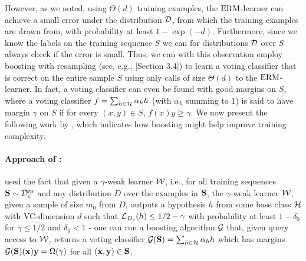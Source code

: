 However, as we noted, using $ \Theta(d) $ training examples, the $ \mathrm{ERM} $-learner can achieve a small error under the distribution $ \mathcal{D} $, from which the training examples are drawn from, with probability at least $ 1- \exp{\left(-d \right)}  $. Furthermore, since we know the labels on the training sequence $ S $ we can for distributions $\mathcal{D}$ over $S$ always check if the error is small. Thus, we can with this observation employ boosting with resampling (see, e.g., \cite{boostingbookSchapireF12}[Section 3.4]) to learn a voting classifier that is correct on the entire sample $ S $  using only calls of size $ \Theta(d) $ to the $ \mathrm{ERM} $-learner. In fact, a voting classifier can even be found with good margins on $ S $, where a voting classifier $ f =\sum_{h\in\mathcal{H}}\alpha_{h}h$ (with $ \alpha_{h} $ summing to 1) is said to have margin $ \gamma $ on $ S $ if for every $ (x,y)\in S $,  $f(x)y\geq \gamma  $. We now present the following work by \cite{Optimalweaktostronglearning}, which indicates how boosting might help improve training complexity.
\vspace{-0.3cm}
\paragraph{Approach of \cite{Optimalweaktostronglearning}:}
\cite{Optimalweaktostronglearning} used the fact that given a $\gamma$-weak learner $ \mathcal{W} $, i.e., for all training sequences $\mathbf{S}\sim \mathcal{D}_{c}^{m}$ and any distribution $D$ over the examples in $\mathbf{S}$, the $ \gamma $-weak learner $\mathcal{W}$, given a sample of size $m_{0}$ from $D$, outputs a hypothesis $h$ from some base class $\mathcal{H}$ with VC-dimension $d$ such that $\operatorname{\mathcal{L}}_{D_{c}}(h)\leq 1/2-\gamma$ with probability at least $1-\delta_{0}$ for $\gamma\leq 1/2$ and $\delta_{0}< 1$ - one can run a boosting algorithm $\mathcal{G}$ that, given query access to $\mathcal{W}$, returns a voting classifier $\mathcal{G}(\mathbf{S})=\sum_{h\in \mathcal{H}} \alpha_{h}h$ which has margins $\mathcal{G}(\mathbf{S})(\mathbf{x})\mathbf{y}=\Omega(\gamma)$ for all $(\mathbf{x},\mathbf{y})\in\mathbf{S}$. 

